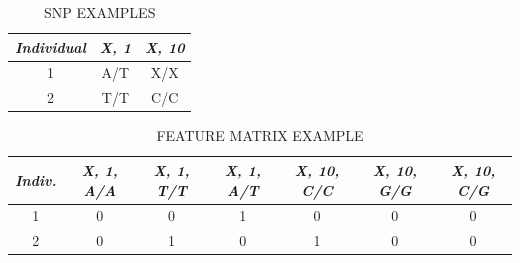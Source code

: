 \begin{table}[H]
  \begin{center}
    \small
    \caption{\label{tab:encoding-example-snps} SNP EXAMPLES}
    \begin{tabular}{ c c c }
      \hline
      \emph{Individual} & \emph{X, 1} & \emph{X, 10} \\ \hline
      1 & A/T & X/X \\
      2 & T/T & C/C \\
    \end{tabular}
  \end{center}

\end{table}

\begin{table}[H]
  \begin{center}
    \small
    \caption{\label{tab:encoding-example-features} FEATURE MATRIX EXAMPLE}
    \begin{tabular}{ c c c c c c c }
      \hline
      \emph{Indiv.} & \emph{X, 1, A/A} & \emph{X, 1, T/T} & \emph{X, 1, A/T} & \emph{X, 10, C/C} & \emph{X, 10, G/G} &\emph{X, 10, C/G} \\ \hline
      1 & 0 & 0 & 1 & 0 & 0 & 0 \\
      2 & 0 & 1 & 0 & 1 & 0 & 0 \\
    \end{tabular}
  \end{center}
  
\end{table}

